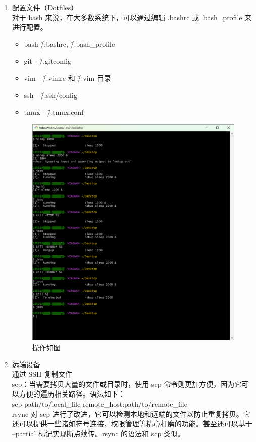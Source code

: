 \documentclass{ctexart}
\begin{document}
\begin{enumerate}
\item 配置文件（Dotfiles）\\
对于 bash 来说，在大多数系统下，可以通过编辑 .bashrc 或 .bash\_profile 来进行配置。
\begin{itemize}
    \item bash \~/.bashrc, \~/.bash\_profile
    \item git - \~/.gitconfig
    \item vim - \~/.vimrc 和 \~/.vim 目录
    \item ssh - \~/.ssh/config
    \item tmux - \~/.tmux.conf
\end{itemize}
\begin{figure}[H]
    \centering
    \includegraphics[width=14cm]{f485e444333525133ef9f155fe3f6593.png}
    \caption{操作如图}
    \label{fig:2}
\end{figure}
\item 远端设备\\
通过 SSH 复制文件\\
scp：当需要拷贝大量的文件或目录时，使用 scp 命令则更加方便，因为它可以方便的遍历相关路径。语法如下：\\
scp path/to/local\_file remote\_host:path/to/remote\_file\\
rsync 对 scp 进行了改进，它可以检测本地和远端的文件以防止重复拷贝。它还可以提供一些诸如符号连接、权限管理等精心打磨的功能。甚至还可以基于 --partial 标记实现断点续传。rsync 的语法和 scp 类似。

\end{enumerate}
\end{document}

